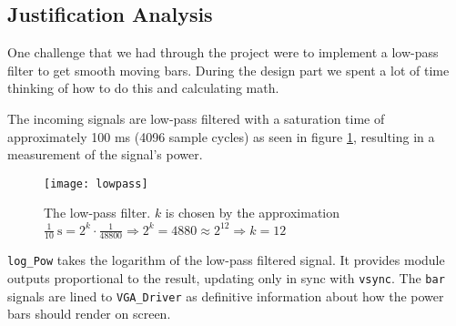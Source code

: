 \subsection{Justification Analysis}\label{sec:just.anal}

One challenge that we had through the project were to implement a low-pass filter to get smooth moving bars. During the design part we spent a lot of time thinking of how to do this and calculating math.

The incoming signals are low-pass filtered with a saturation time of approximately 100 ms (4096 sample cycles) as seen in figure \ref{fig:lowpass}, resulting in a measurement of the signal's power. 

\begin{figure}[h]
\centering
\texttt{[image: lowpass]}
\caption{The low-pass filter. $k$ is chosen by the approximation $\frac{1}{10}\mathrm{\ s} = 2^k\cdot\frac{1}{48800}\Rightarrow 2^k=4880\approx 2^{12}\Rightarrow k = 12 $}
\label{fig:lowpass}
\end{figure}


\verb=log_Pow= takes the logarithm of the low-pass filtered signal. It provides module outputs proportional to the result, updating only in sync with \verb+vsync+. The \verb+bar+ signals are lined to \verb+VGA_Driver+ as definitive information about how the power bars should render on screen.


